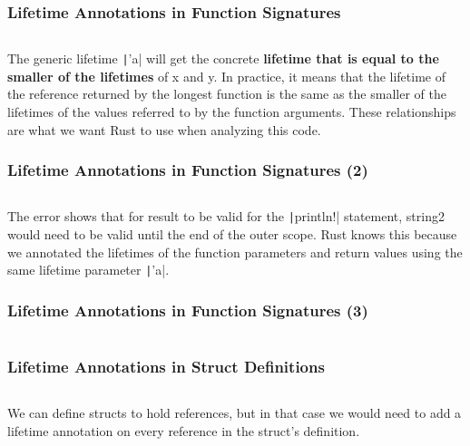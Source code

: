\documentclass{beamer}
\begin{document}
\begin{frame}[fragile]
	\frametitle{Lifetime Annotations in Function Signatures}
	\inputminted{rust}{./code/lifetime4.rs}
	
	 The generic lifetime \texttt|'a| will get the concrete \textbf{lifetime that is equal to the smaller of the lifetimes }of x and y. In practice, it means that the lifetime of the reference returned by the longest function is the same as the smaller of the lifetimes of the values referred to by the function arguments. These relationships are what we want Rust to use when analyzing this code.
\end{frame}


\begin{frame}[fragile]
	\frametitle{Lifetime Annotations in Function Signatures (2)}
	\inputminted{rust}{./code/lifetime5.rs}
	
	The error shows that for result to be valid for the \texttt|println!| statement, string2 would need to be valid until the end of the outer scope. Rust knows this because we annotated the lifetimes of the function parameters and return values using the same lifetime parameter \texttt|'a|.
	
\end{frame}

 \begin{frame}[fragile]
 	\frametitle{Lifetime Annotations in Function Signatures (3)}
 	\inputminted{shell}{./code/lifetime5.shell}
 
 \end{frame}

\begin{frame}[fragile]
	\frametitle{Lifetime Annotations in Struct Definitions}
	\inputminted{rust}{./code/lifetime6.rs}
	
	We can define structs to hold references, but in that case we would need to add a lifetime annotation on every reference in the struct’s definition.
	
\end{frame}
\end{document}
